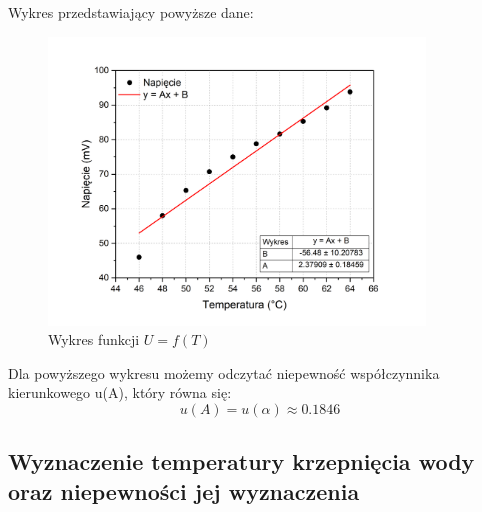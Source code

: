 Wykres przedstawiający powyższe dane:
\begin{figure}[!ht]
    \centering
    \includegraphics[width = 10cm]{imgs/Graph3.png}
    \caption{Wykres funkcji $U = f(T)$}
    \label{fig:wykres-skalowania}
\end{figure}

Dla powyższego wykresu możemy odczytać niepewność współczynnika kierunkowego u(A), który równa się: $$u(A) = u(\alpha) \approx 0.1846$$

\newpage %
{\subsection{Wyznaczenie temperatury krzepnięcia wody oraz niepewności jej wyznaczenia}}

